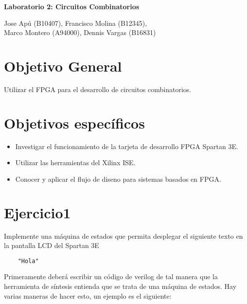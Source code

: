 \documentclass[10pt]{article}
\begin{document}
\begin{huge}
\begin{center}
\textbf{Laboratorio 2: Circuitos Combinatorios}
\end{center}
\end{huge}

\begin{Large}
\begin{center}
Jose Apú (B10407), Francisco Molina (B12345), \\Marco Montero (A94000), Dennis Vargas (B16831)
\end{center}
\end{Large}


\section*{Objetivo General}
Utilizar el FPGA para el desarrollo de circuitos combinatorios.

\section*{Objetivos específicos}
\begin{itemize}
\item Investigar el funcionamiento de la tarjeta de desarrollo FPGA Spartan 3E.
\item Utilizar las herramientas del Xilinx ISE.
\item Conocer y aplicar el flujo de diseno para sistemas basados en FPGA.
\end{itemize}

\newpage

\section*{Ejercicio1}
Implemente una máquina de estados que permita desplegar el siguiente texto en la pantalla LCD del Spartan 3E
\begin{lstlisting}
	"Hola"
\end{lstlisting}
Primeramente deberá escribir un código de verilog de tal manera que la herramienta de síntesis entienda que se trata de una máquina de estados. Hay varias maneras de hacer esto, un ejemplo es el siguiente:
\end{document}
